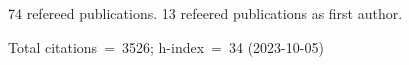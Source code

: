 74 refereed publications. 13 refeered publications as first author.

Total citations~=~3526; h-index~=~34 (2023-10-05)